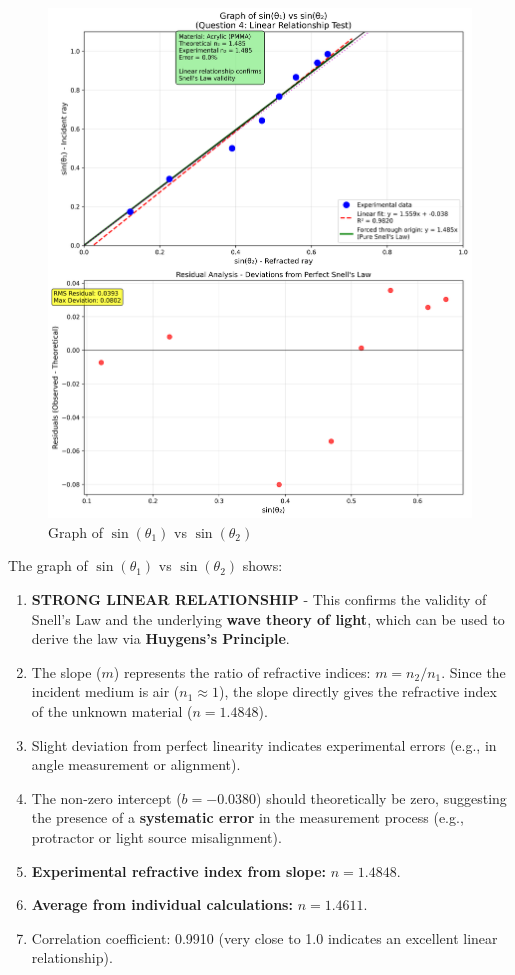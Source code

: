\documentclass[12pt, a4paper]{article}
\begin{document}
\begin{figure}[H]
\centering
\includegraphics[width=\textwidth]{graphs/sin_theta_analysis.png}
\caption{Graph of $\sin(\theta_1)$ vs $\sin(\theta_2)$}
\label{fig:sin_theta}
\end{figure}

The graph of $\sin(\theta_1)$ vs $\sin(\theta_2)$ shows:
\begin{enumerate}
\item \textbf{STRONG LINEAR RELATIONSHIP} - This confirms the validity of Snell's Law and the underlying \textbf{wave theory of light}, which can be used to derive the law via \textbf{Huygens's Principle}.
\item The slope ($m$) represents the ratio of refractive indices: $m = n_2 / n_1$. Since the incident medium is air ($n_1 \approx 1$), the slope directly gives the refractive index of the unknown material ($n = 1.4848$).
\item Slight deviation from perfect linearity indicates experimental errors (e.g., in angle measurement or alignment).
\item The non-zero intercept ($b = -0.0380$) should theoretically be zero, suggesting the presence of a \textbf{systematic error} in the measurement process (e.g., protractor or light source misalignment).
\item \textbf{Experimental refractive index from slope:} $n = 1.4848$.
\item \textbf{Average from individual calculations:} $n = 1.4611$.
\item Correlation coefficient: 0.9910 (very close to 1.0 indicates an excellent linear relationship).
\end{enumerate}
\end{document}
